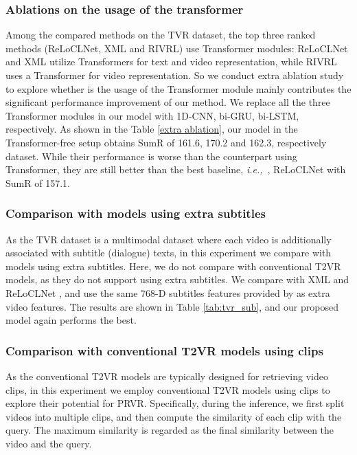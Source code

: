 \documentclass[sigconf]{acmart}
\newcommand{\ie}{\emph{i.e.,}~}
\begin{document}
\subsubsection{Ablations on the usage of the transformer} \label{sec:extra ablation}
Among the compared methods on the TVR dataset, the top three ranked methods (ReLoCLNet, XML and RIVRL) use Transformer modules: ReLoCLNet and XML utilize Transformers for text and video representation, while RIVRL uses a Transformer for video representation.
So we conduct extra ablation study to explore whether is the usage of the  Transformer module mainly contributes the significant performance improvement of our method.
We replace all the three Transformer modules in our model with 1D-CNN, bi-GRU, bi-LSTM, respectively. As shown in the Table \ref{extra ablation}, our model in the Transformer-free setup obtains SumR of 161.6, 170.2 and 162.3, respectively \cite{lei2020tvr} dataset. While their performance is worse than the counterpart using Transformer, they are still better than the best baseline, \ie, ReLoCLNet with SumR of 157.1.


\subsubsection{Comparison with models using extra subtitles}\label{tvr-sub}
As the TVR dataset is a multimodal dataset where each video is additionally associated with subtitle (dialogue) texts, in this experiment we compare with models using extra subtitles. Here, we do not compare with conventional T2VR models, as they do not support using extra subtitles.
We compare with XML \cite{lei2020tvr} and ReLoCLNet \cite{zhang2021video}, and use the same 768-D subtitles features provided by \cite{lei2020tvr} as extra video features. The results are shown in Table \ref{tab:tvr_sub}, and our proposed model again performs the best.





\subsubsection{Comparison with conventional T2VR models using clips}\label{tvr-clip}

As the conventional T2VR models are typically designed for retrieving video clips, in this experiment we employ conventional T2VR  models using clips to explore their potential for PRVR.
Specifically, during the inference, we first split videos into multiple clips, and then compute the similarity of each clip with the query. The maximum similarity is regarded as the final similarity between the video and the query.
\end{document}
